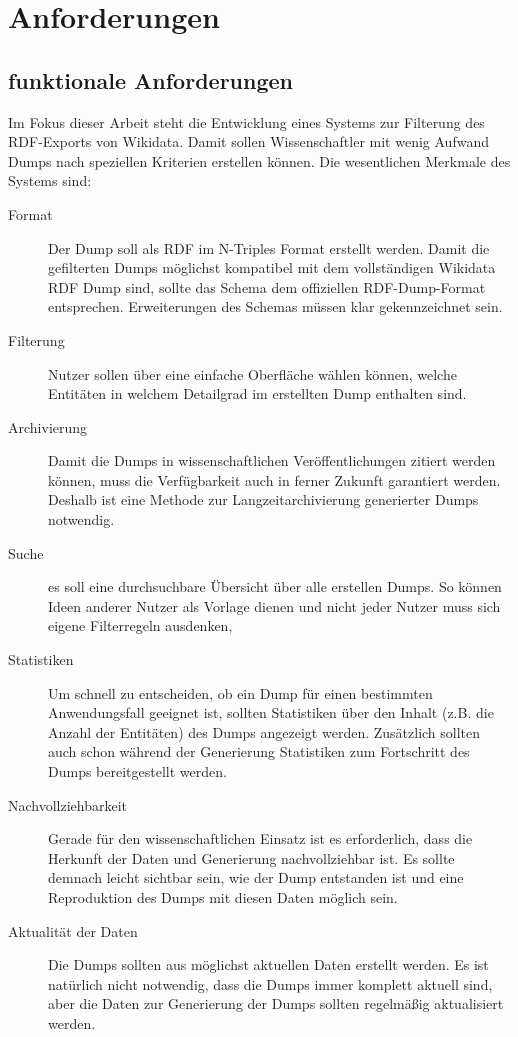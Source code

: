 \chapter{Anforderungen}

\section{funktionale Anforderungen}
Im Fokus dieser Arbeit steht die Entwicklung eines Systems zur Filterung des RDF-Exports von Wikidata.
Damit sollen Wissenschaftler mit wenig Aufwand Dumps nach speziellen Kriterien erstellen können.
Die wesentlichen Merkmale des Systems sind:

\begin{description}
  \item[Format] Der Dump soll als RDF im N-Triples Format erstellt werden. Damit die gefilterten Dumps möglichst kompatibel mit dem vollständigen Wikidata RDF Dump sind, sollte das Schema dem offiziellen RDF-Dump-Format entsprechen. Erweiterungen des Schemas müssen klar gekennzeichnet sein.
  \item[Filterung] Nutzer sollen über eine einfache Oberfläche wählen können, welche Entitäten in welchem Detailgrad im erstellten Dump enthalten sind. 
  \item[Archivierung] Damit die Dumps in wissenschaftlichen Veröffentlichungen zitiert werden können, muss die Verfügbarkeit auch in ferner Zukunft garantiert werden. Deshalb ist eine Methode zur Langzeitarchivierung generierter Dumps notwendig. 
  \item[Suche] es soll eine durchsuchbare Übersicht über alle erstellen Dumps.
    So können Ideen anderer Nutzer als Vorlage dienen und nicht jeder Nutzer muss sich eigene Filterregeln ausdenken,
  \item[Statistiken] Um schnell zu entscheiden, ob ein Dump für einen bestimmten Anwendungsfall geeignet ist, sollten Statistiken über den Inhalt (z.B. die Anzahl der Entitäten) des Dumps angezeigt werden. Zusätzlich sollten auch schon während der Generierung Statistiken zum Fortschritt des Dumps bereitgestellt werden.
  \item[Nachvollziehbarkeit] Gerade für den wissenschaftlichen Einsatz ist es erforderlich, dass die Herkunft der Daten und Generierung nachvollziehbar ist. Es sollte demnach leicht sichtbar sein, wie der Dump entstanden ist und eine Reproduktion des Dumps mit diesen Daten möglich sein. 
  \item[Aktualität der Daten] Die Dumps sollten aus möglichst aktuellen Daten erstellt werden.
    Es ist natürlich nicht notwendig, dass die Dumps immer komplett aktuell sind, aber die Daten zur Generierung der Dumps sollten regelmäßig aktualisiert werden.
\end{description}

